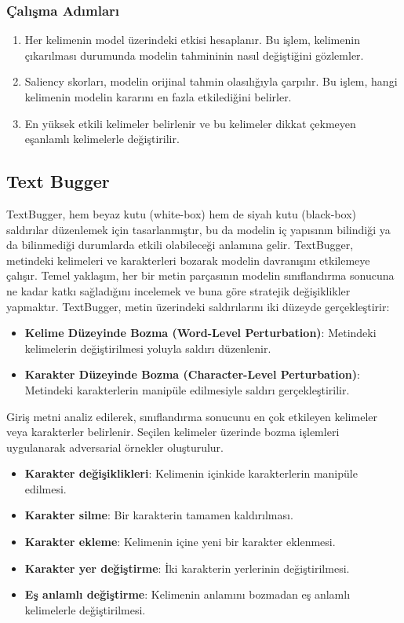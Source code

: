 \subsubsection{Çalışma Adımları}

\begin{enumerate}
    \item Her kelimenin model üzerindeki etkisi hesaplanır. Bu işlem, kelimenin çıkarılması durumunda modelin tahmininin nasıl değiştiğini gözlemler.
    \item Saliency skorları, modelin orijinal tahmin olasılığıyla çarpılır. Bu işlem, hangi kelimenin modelin kararını en fazla etkilediğini belirler.
    \item En yüksek etkili kelimeler belirlenir ve bu kelimeler dikkat çekmeyen eşanlamlı kelimelerle değiştirilir.
\end{enumerate}

\newpage

\subsection{Text Bugger}

TextBugger, hem beyaz kutu (white-box) hem de siyah kutu (black-box) saldırılar düzenlemek için tasarlanmıştır, bu da modelin iç yapısının bilindiği ya da bilinmediği durumlarda etkili olabileceği anlamına gelir. TextBugger, metindeki kelimeleri ve karakterleri bozarak modelin davranışını etkilemeye çalışır. Temel yaklaşım, her bir metin parçasının modelin sınıflandırma sonucuna ne kadar katkı sağladığını incelemek ve buna göre stratejik değişiklikler yapmaktır. TextBugger, metin üzerindeki saldırılarını iki düzeyde gerçekleştirir:

\begin{itemize}
    \item \textbf{Kelime Düzeyinde Bozma (Word-Level Perturbation)}: Metindeki kelimelerin değiştirilmesi yoluyla saldırı düzenlenir.
    \item \textbf{Karakter Düzeyinde Bozma (Character-Level Perturbation)}: Metindeki karakterlerin manipüle edilmesiyle saldırı gerçekleştirilir.
\end{itemize}

Giriş metni analiz edilerek, sınıflandırma sonucunu en çok etkileyen kelimeler veya karakterler belirlenir. Seçilen kelimeler üzerinde bozma işlemleri uygulanarak adversarial örnekler oluşturulur.

\begin{itemize}
    \item \textbf{Karakter değişiklikleri}: Kelimenin içinkide karakterlerin manipüle edilmesi.
    \item \textbf{Karakter silme}: Bir karakterin tamamen kaldırılması.
    \item \textbf{Karakter ekleme}: Kelimenin içine yeni bir karakter eklenmesi.
    \item \textbf{Karakter yer değiştirme}: İki karakterin yerlerinin değiştirilmesi.
    \item \textbf{Eş anlamlı değiştirme}: Kelimenin anlamını bozmadan eş anlamlı kelimelerle değiştirilmesi.
\end{itemize}

